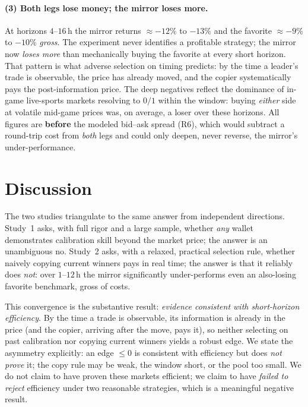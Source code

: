 \documentclass[11pt]{article}
\begin{document}
\paragraph{(3) Both legs lose money; the mirror loses more.} At horizons $4$--$16$\,h the
mirror returns $\approx-12\%$ to $-13\%$ and the favorite $\approx-9\%$ to $-10\%$ \emph{gross}.
The experiment never identifies a profitable strategy; the mirror now \emph{loses more} than
mechanically buying the favorite at every short horizon. That pattern is what adverse selection
on timing predicts: by the time a leader's trade is observable, the price has already moved,
and the copier systematically pays the post-information price. The deep negatives reflect the
dominance of in-game live-sports markets resolving to $0/1$ within the window: buying
\emph{either} side at volatile mid-game prices was, on average, a loser over these horizons.
All figures are \textbf{before} the modeled bid--ask spread (R6), which would subtract a
round-trip cost from \emph{both} legs and could only deepen, never reverse, the mirror's
under-performance.

\section{Discussion}
The two studies triangulate to the same answer from independent directions. Study~1 asks, with
full rigor and a large sample, whether \emph{any} wallet demonstrates calibration skill beyond
the market price; the answer is an unambiguous no. Study~2 asks, with a relaxed, practical
selection rule, whether naively copying current winners pays in real time; the answer is that
it reliably does \emph{not}: over $1$--$12$\,h the mirror significantly under-performs even an
also-losing favorite benchmark, gross of costs.

This convergence is the substantive result: \emph{evidence consistent with short-horizon
efficiency}. By the time a trade is observable, its information is already in the price (and
the copier, arriving after the move, pays it), so neither selecting on past calibration nor
copying current winners yields a robust edge. We state the asymmetry explicitly: an edge
$\le 0$ is consistent with efficiency but does \emph{not prove} it; the copy rule may be weak,
the window short, or the pool too small. We do not claim
to have proven these markets efficient; we claim to have \emph{failed to reject} efficiency under
two reasonable strategies, which is a meaningful negative result.
\end{document}
